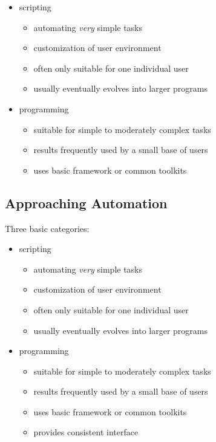 \documentclass[xga]{xdvislides}
\begin{document}
\begin{itemize}
	\item scripting
		\begin{itemize}
			\item automating {\em very} simple tasks
			\item customization of user environment
			\item often only suitable for one individual user
			\item usually eventually evolves into larger programs
		\end{itemize}
	\item programming
		\begin{itemize}
			\item suitable for simple to moderately complex tasks
			\item results frequently used by a small base of users
			\item uses basic framework or common toolkits
		\end{itemize}
\end{itemize}

\subsection{Approaching Automation}
Three basic categories:
\\

\begin{itemize}
	\item scripting
		\begin{itemize}
			\item automating {\em very} simple tasks
			\item customization of user environment
			\item often only suitable for one individual user
			\item usually eventually evolves into larger programs
		\end{itemize}
	\item programming
		\begin{itemize}
			\item suitable for simple to moderately complex tasks
			\item results frequently used by a small base of users
			\item uses basic framework or common toolkits
			\item provides consistent interface
		\end{itemize}
\end{itemize}
\end{document}
